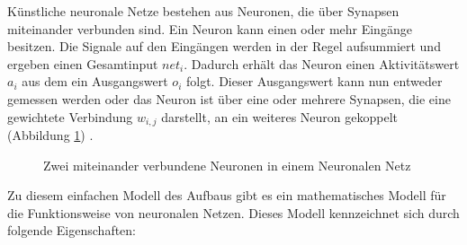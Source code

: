 \documentclass[12pt]{article}
\begin{document}
	Künstliche neuronale Netze bestehen aus Neuronen, die über Synapsen miteinander verbunden sind. Ein Neuron kann einen oder mehr Eingänge besitzen. Die Signale auf den Eingängen werden in der Regel aufsummiert und ergeben einen Gesamtinput $net_i$. Dadurch erhält das Neuron einen Aktivitätswert $a_i$ aus dem ein Ausgangswert $o_i$ folgt. Dieser Ausgangswert kann nun entweder gemessen werden oder das Neuron ist über eine oder mehrere Synapsen, die eine gewichtete Verbindung $w_{i,j}$ darstellt, an ein weiteres Neuron gekoppelt (Abbildung \ref{2n}) \cite{PDP}.
	
\begin{figure}[H]
	\caption{Zwei miteinander verbundene Neuronen in einem Neuronalen Netz}
	\label{2n}
\end{figure}

	Zu diesem einfachen Modell des Aufbaus gibt es ein mathematisches Modell für die Funktionsweise von neuronalen Netzen. Dieses Modell kennzeichnet sich durch folgende Eigenschaften:
	
\end{document}
